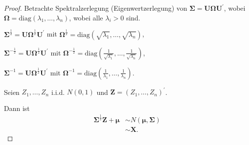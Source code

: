 \documentclass{tstextbook}
\begin{document}
\begin{proof}
	Betrachte Spektralzerlegung (Eigenwertzerlegung) von $ \boldsymbol{\Sigma} = \mathbf{U}\mathbf{\Omega} \mathbf{U}^\prime $, wobei $ \mathbf{\Omega} = \text{diag} \left(\lambda_1,\ldots,\lambda_n \right) $, wobei alle $ \lambda_i > 0 $ sind.
	
	$ \boldsymbol{\Sigma}^{\frac{1}{2}} = \mathbf{U}\mathbf{\Omega}^{\frac{1}{2}} \mathbf{U}^\prime $ mit $ \mathbf{\Omega}^{\frac{1}{2}} = \text{diag} \left(\sqrt{\lambda_1},\ldots,\sqrt{\lambda_n} \right) $,
	
	$ \boldsymbol{\Sigma}^{- \frac{1}{2}} = \mathbf{U}\mathbf{\Omega}^{\frac{1}{2}} \mathbf{U}^\prime $ mit $ \mathbf{\Omega}^{- \frac{1}{2}} = \text{diag} \left(\frac{1}{\sqrt{\lambda_1}},\ldots,\frac{1}{\sqrt{\lambda_n}} \right) $,
	
	$ \boldsymbol{\Sigma}^{-1} = \mathbf{U}\mathbf{\Omega}^{\frac{1}{2}} \mathbf{U}^\prime $ mit $ \mathbf{\Omega}^{-1} = \text{diag} \left(\frac{1}{\lambda_1},\ldots,\frac{1}{\lambda_n} \right) $.
	
	Seien $ Z_1,\ldots,Z_n $ i.i.d. $ N(0,1) $ und $ \mathbf{Z}=\left(Z_1,\ldots,Z_n\right)^\prime $.
	
	Dann ist \[ \begin{aligned}
		\boldsymbol{\Sigma}^\frac{1}{2} \mathbf{Z} + \boldsymbol{\mu} &\sim N(\boldsymbol{\mu}, \boldsymbol{\Sigma}) \\
		&\sim \mathbf{X}. 
	\end{aligned}
	\] 
	

\end{proof}
\end{document}
